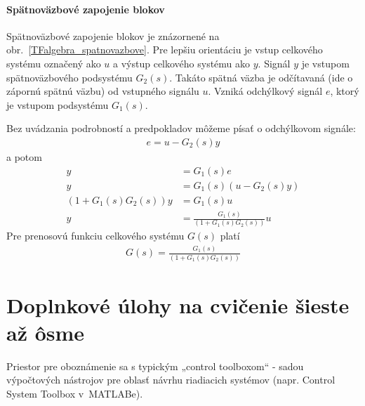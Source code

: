 \documentclass[a4paper, 10pt, ]{article}
\begin{document}
\paragraph{Spätnoväzbové zapojenie blokov}

Spätnoväzbové zapojenie blokov je znázornené na obr.~\ref{TFalgebra_spatnovazbove}. Pre lepšiu orientáciu je vstup celkového systému označený ako $u$ a výstup celkového systému ako $y$. Signál $y$ je vstupom spätnoväzbového podsystému $G_2(s)$. Takáto spätná väzba je odčítavaná (ide o zápornú spätnú väzbu) od vstupného signálu $u$. Vzniká odchýlkový signál $e$, ktorý je vstupom podsystému $G_1(s)$.


\begin{center}

    \makebox[\textwidth][c]{%
    
    }

	\label{TFalgebra_spatnovazbove}

\end{center}

Bez uvádzania podrobností a predpokladov môžeme písať o odchýlkovom signále:
\begin{align}
    e = u - G_2(s) y
\end{align}
a potom
\begin{subequations}
    \begin{align}
        y &= G_1(s) e \\
        y &= G_1(s) \left( u - G_2(s) y \right) \\
        \left( 1 + G_1(s)G_2(s) \right) y &= G_1(s) u  \\
        y &= \frac{G_1(s)}{\left( 1 + G_1(s)G_2(s) \right)} u
    \end{align}
\end{subequations}
Pre prenosovú funkciu celkového systému $G(s)$ platí
\begin{align}
   G(s) = \frac{G_1(s)}{\left( 1 + G_1(s)G_2(s) \right)}
\end{align}









\section{Doplnkové úlohy na cvičenie šieste až ôsme}

Priestor pre oboznámenie sa s typickým „control toolboxom“ - sadou výpočtových nástrojov pre oblasť návrhu riadiacich systémov (napr. Control System Toolbox v~MATLABe).
\end{document}

